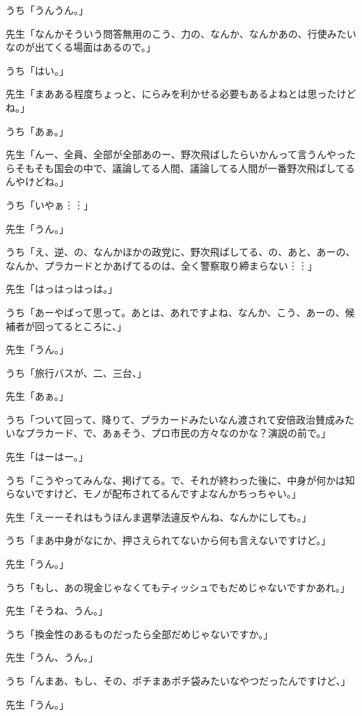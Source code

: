 \documentclass[b5j,twoside,twocolumn]{utarticle}
\begin{document}
\begin{description}
\item うち「うんうん。」
\item 先生「なんかそういう問答無用のこう、力の、なんか、なんかあの、行使みたいなのが出てくる場面はあるので。」
\item うち「はい。」
\item 先生「まあある程度ちょっと、にらみを利かせる必要もあるよねとは思ったけどね。」
\item うち「あぁ。」
\item 先生「んー、全員、全部が全部あのー、野次飛ばしたらいかんって言うんやったらそもそも国会の中で、議論してる人間、議論してる人間が一番野次飛ばしてるんやけどね。」
\item うち「いやぁ︙︙」
\item 先生「うん。」
\item うち「え、逆、の、なんかほかの政党に、野次飛ばしてる、の、あと、あーの、なんか、プラカードとかあげてるのは、全く警察取り締まらない︙︙」
\item 先生「はっはっはっは。」
\item うち「あーやばって思って。あとは、あれですよね、なんか、こう、あーの、候補者が回ってるところに、」
\item 先生「うん。」
\item うち「旅行バスが、二、三台、」
\item 先生「あぁ。」
\item うち「ついて回って、降りて、プラカードみたいなん渡されて安倍政治賛成みたいなプラカード、で、あぁそう、プロ市民の方々なのかな？演説の前で。」
\item 先生「はーはー。」
\item うち「こうやってみんな、掲げてる。で、それが終わった後に、中身が何かは知らないですけど、モノが配布されてるんですよなんかちっちゃい。」
\item 先生「えーーそれはもうほんま選挙法違反やんね、なんかにしても。」
\item うち「まあ中身がなにか、押さえられてないから何も言えないですけど。」
\item 先生「うん。」
\item うち「もし、あの現金じゃなくてもティッシュでもだめじゃないですかあれ。」
\item 先生「そうね、うん。」
\item うち「換金性のあるものだったら全部だめじゃないですか。」
\item 先生「うん、うん。」
\item うち「んまあ、もし、その、ポチまあポチ袋みたいなやつだったんですけど、」
\item 先生「うん。」

\end{description}
\end{document}
